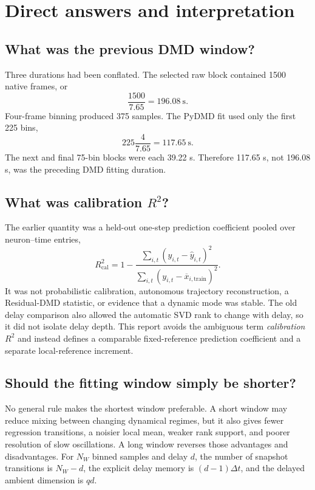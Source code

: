 \documentclass[11pt]{article}
\begin{document}
\section{Direct answers and interpretation}

\subsection{What was the previous DMD window?}

Three durations had been conflated.  The selected raw block contained 1500
native frames, or
\[
\frac{1500}{7.65}=196.08\ \mathrm{s}.
\]
Four-frame binning produced 375 samples.  The PyDMD fit used only the first
225 bins,
\[
225\frac{4}{7.65}=117.65\ \mathrm{s}.
\]
The next and final 75-bin blocks were each 39.22 s.  Therefore 117.65 s,
not 196.08 s, was the preceding DMD fitting duration.

\subsection{What was calibration \texorpdfstring{\(R^2\)}{R2}?}

The earlier quantity was a held-out one-step prediction coefficient pooled
over neuron--time entries,
\[
R^2_{\mathrm{cal}}
=1-\frac{\sum_{i,t}(y_{i,t}-\widehat y_{i,t})^2}
{\sum_{i,t}(y_{i,t}-\overline x_{i,\mathrm{train}})^2}.
\]
It was not probabilistic calibration, autonomous trajectory reconstruction,
a Residual-DMD statistic, or evidence that a dynamic mode was stable.  The
old delay comparison also allowed the automatic SVD rank to change with
delay, so it did not isolate delay depth.  This report avoids the ambiguous
term \emph{calibration \(R^2\)} and instead defines a comparable
fixed-reference prediction coefficient and a separate local-reference
increment.

\subsection{Should the fitting window simply be shorter?}

No general rule makes the shortest window preferable.  A short window may
reduce mixing between changing dynamical regimes, but it also gives fewer
regression transitions, a noisier local mean, weaker rank support, and poorer
resolution of slow oscillations.  A long window reverses those advantages and
disadvantages.  For \(N_W\) binned samples and delay \(d\), the number of
snapshot transitions is \(N_W-d\), the explicit delay memory is
\((d-1)\Delta t\), and the delayed ambient dimension is \(qd\).
\end{document}
